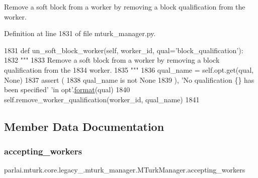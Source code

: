 \begin{DoxyVerb}Remove a soft block from a worker by removing a block qualification from the
worker.
\end{DoxyVerb}
 

Definition at line 1831 of file mturk\+\_\+manager.\+py.


\begin{DoxyCode}
1831     \textcolor{keyword}{def }un\_soft\_block\_worker(self, worker\_id, qual='block\_qualification'):
1832         \textcolor{stringliteral}{"""}
1833 \textcolor{stringliteral}{        Remove a soft block from a worker by removing a block qualification from the}
1834 \textcolor{stringliteral}{        worker.}
1835 \textcolor{stringliteral}{        """}
1836         qual\_name = self.opt.get(qual, \textcolor{keywordtype}{None})
1837         \textcolor{keyword}{assert} (
1838             qual\_name \textcolor{keywordflow}{is} \textcolor{keywordflow}{not} \textcolor{keywordtype}{None}
1839         ), \textcolor{stringliteral}{'No qualification \{\} has been specified'} \textcolor{stringliteral}{'in opt'}.\hyperlink{namespaceparlai_1_1chat__service_1_1services_1_1messenger_1_1shared__utils_a32e2e2022b824fbaf80c747160b52a76}{format}(qual)
1840         self.remove\_worker\_qualification(worker\_id, qual\_name)
1841 
\end{DoxyCode}


\subsection{Member Data Documentation}
\mbox{\label{classparlai_1_1mturk_1_1core_1_1legacy__2018_1_1mturk__manager_1_1MTurkManager_ac039b79b2cdc719a0860224cf9fa59a9}} 
\subsubsection{\texorpdfstring{accepting\+\_\+workers}{accepting\_workers}}
{\footnotesize\ttfamily parlai.\+mturk.\+core.\+legacy\+\_.\+mturk\+\_\+manager.\+M\+Turk\+Manager.\+accepting\+\_\+workers}



